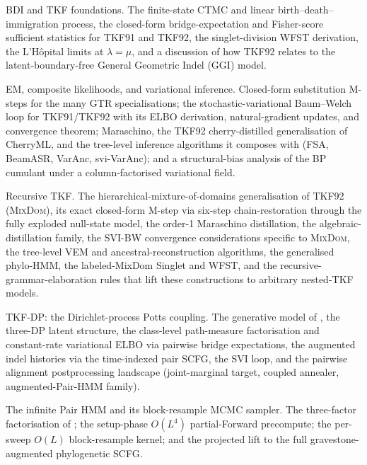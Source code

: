 \documentclass[11pt]{article}
\theoremstyle{definition}
\theoremstyle{remark}
\newcommand{\MixDom}{\textsc{MixDom}}
\begin{document}
\begin{description}
\setlength{\itemsep}{0.2em}
\item[Appendix A.] BDI and TKF foundations.
  The finite-state CTMC and linear birth--death--immigration
  process, the closed-form bridge-expectation and Fisher-score
  sufficient statistics for TKF91 and TKF92, the singlet-division
  WFST derivation, the L'H\^opital limits at $\lambda{=}\mu$, and
  a discussion of how TKF92 relates to the latent-boundary-free
  General Geometric Indel (GGI) model.

\item[Appendix B.] EM, composite likelihoods, and variational
  inference. Closed-form substitution M-steps for the many GTR
  specialisations; the stochastic-variational Baum--Welch loop
  for TKF91/TKF92 with its ELBO derivation, natural-gradient
  updates, and convergence theorem; Maraschino, the TKF92
  cherry-distilled generalisation of CherryML, and the
  tree-level inference algorithms it composes with (FSA, BeamASR,
  VarAnc, svi-VarAnc); and a structural-bias analysis of the BP
  cumulant under a column-factorised variational field.
  
\item[Appendix C.] Recursive TKF.
  The hierarchical-mixture-of-domains generalisation of TKF92
  (\MixDom), its exact closed-form M-step via six-step
  chain-restoration through the fully exploded null-state model,
  the order-1 Maraschino distillation, the algebraic-distillation
  family, the SVI-BW convergence considerations specific to
  \MixDom, the tree-level VEM and ancestral-reconstruction
  algorithms, the generalised phylo-HMM, the labeled-MixDom
  Singlet and WFST, and the recursive-grammar-elaboration rules
  that lift these constructions to arbitrary nested-TKF models.
  
\item[Appendix D.] TKF-DP: the Dirichlet-process Potts coupling.
  The generative model of , the
  three-DP latent structure, the class-level path-measure
  factorisation and constant-rate variational ELBO via
  pairwise bridge expectations, the augmented indel histories via
  the time-indexed pair SCFG, the SVI loop, and the pairwise
  alignment postprocessing landscape (joint-marginal target,
  coupled annealer, augmented-Pair-HMM family).

\item[Appendix E.] The infinite Pair HMM and its block-resample
  MCMC sampler. The three-factor factorisation of
  ; the setup-phase $O(L^4)$ partial-Forward
  precompute; the per-sweep $O(L)$ block-resample kernel;
  and the projected lift to the full
  gravestone-augmented phylogenetic SCFG.
\end{description}
\end{document}
